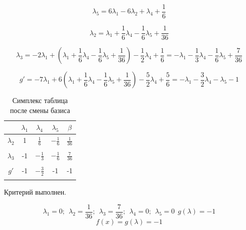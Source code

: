 \documentclass{article}
\begin{document}
\[\lambda_5 = 6\lambda_1-6\lambda_2+\lambda_4+\frac{1}{6}\]

\[\lambda_2 = \lambda_1 +\frac{1}{6}\lambda_4 -\frac{1}{6}\lambda_5+\frac{1}{36}\]

\[\lambda_3 = -2\lambda_1+(\lambda_1 +\frac{1}{6}\lambda_4 -\frac{1}{6}\lambda_5+\frac{1}{36})-\frac{1}{2}\lambda_4+\frac{1}{6}=
-\lambda_1 - \frac{1}{3}\lambda_4 - \frac{1}{6}\lambda_5 + \frac{7}{36}\]

\[g' = -7\lambda_1+6(\lambda_1 +\frac{1}{6}\lambda_4 -\frac{1}{6}\lambda_5+\frac{1}{36})-\frac{5}{2}\lambda_4+\frac{5}{6} = 
-\lambda_1 - \frac{3}{2}\lambda_4 - \lambda_5 -1\]

\begin{table}[H]
    \centering
    \caption{Симплекс таблица после смены базиса}
    \begin{tabular}{|c|c|c|c|c|}
    \hline
               &$\lambda_1$&$\lambda_4$&$\lambda_5$&$\beta$\\\hline
    $\lambda_2$&1&$\frac{1}{6}$&$-\frac{1}{6}$&$\frac{1}{36}$\\
    &&&&\\\hline
    $\lambda_3$&-1&$-\frac{1}{3}$&$-\frac{1}{6}$&$\frac{7}{36}$\\
    &&&&\\\hline
    $g'$&-1&$-\frac{3}{2}$&-1&-1\\
    &&&&\\\hline
    \end{tabular}
\end{table}
Критерий выполнен.

\[\lambda_1 = 0;\ \ \lambda_2 = \frac{1}{36};\ \ \lambda_3 = \frac{7}{36};\ \ \lambda_4 = 0;\ \ \lambda_5 = 0 \ \ g(\lambda) = -1\]
\[f(x) = g(\lambda) = -1\]
\end{document}
